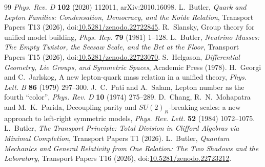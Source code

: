 \documentclass[11pt]{article}
\theoremstyle{definition}
\theoremstyle{plain}
\begin{document}
\begin{thebibliography}{99}
\emph{Phys. Rev. D} \textbf{102} (2020) 112011, arXiv:2010.16098.
 L.~Butler,
\emph{Quark and Lepton Families: Condensation, Democracy, and the Koide Relation},
Transport Papers T13 (2026), doi:\href{https://doi.org/10.5281/zenodo.22722845}{10.5281/zenodo.22722845}.
 R.~Slansky,
Group theory for unified model building,
\emph{Phys. Rep.} \textbf{79} (1981) 1--128.
 L.~Butler,
\emph{Neutrino Masses: The Empty Twistor, the Seesaw Scale, and the Bet at the Floor},
Transport Papers T15 (2026), doi:\href{https://doi.org/10.5281/zenodo.22723070}{10.5281/zenodo.22723070}.
 S.~Helgason,
\emph{Differential Geometry, Lie Groups, and Symmetric Spaces},
Academic Press (1978).
 H.~Georgi and C.~Jarlskog,
A new lepton-quark mass relation in a unified theory,
\emph{Phys. Lett. B} \textbf{86} (1979) 297--300.
 J.~C.~Pati and A.~Salam,
Lepton number as the fourth ``color'',
\emph{Phys. Rev. D} \textbf{10} (1974) 275--289.
 D.~Chang, R.~N.~Mohapatra and M.~K.~Parida,
Decoupling parity and $SU(2)_{R}$-breaking scales: a new approach to left-right symmetric models,
\emph{Phys. Rev. Lett.} \textbf{52} (1984) 1072--1075.
 L.~Butler,
\emph{The Transport Principle: Total Division in Clifford Algebras via Minimal Completion},
Transport Papers T1 (2026).
 L.~Butler,
\emph{Quantum Mechanics and General Relativity from One Relation: The Two Shadows and the Laboratory},
Transport Papers T16 (2026), doi:\href{https://doi.org/10.5281/zenodo.22723212}{10.5281/zenodo.22723212}.
\end{thebibliography}
\end{document}
